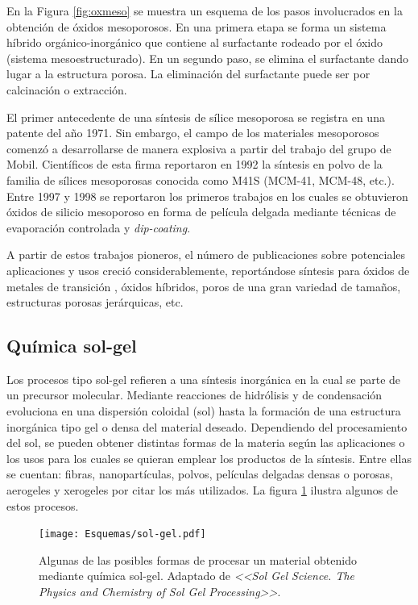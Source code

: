 	 En la Figura \ref{fig:oxmeso} se muestra un esquema de los pasos involucrados en la obtención de óxidos mesoporosos. En una primera etapa se forma un sistema híbrido orgánico-inorgánico que contiene al surfactante rodeado por el óxido (sistema mesoestructurado). En un segundo paso, se elimina el surfactante dando lugar a la estructura porosa. La eliminación del surfactante puede ser por calcinación o extracción.
 

     El primer antecedente de una síntesis de sílice mesoporosa se registra en una patente del año 1971. Sin embargo, el campo de los materiales mesoporosos comenzó a desarrollarse de manera explosiva a partir del trabajo del grupo de Mobil. Científicos de esta firma reportaron en 1992 la síntesis en polvo de la familia de sílices mesoporosas conocida como M41S (MCM-41, MCM-48, etc.).\cite{Kresge1992,Beck1992} Entre 1997 y 1998 se reportaron los primeros trabajos en los cuales se obtuvieron óxidos de silicio mesoporoso en forma de película delgada mediante técnicas de evaporación controlada y \textit{dip-coating}.\cite{Lu1997,Zhao1998a,Zhao1998,Brinker1999} 

     A partir de estos trabajos pioneros, el número de publicaciones sobre potenciales aplicaciones y usos creció considerablemente, reportándose síntesis para óxidos de metales de transición \cite{Ciesla1996,Ulagappan1996,Antonelli1995}, óxidos híbridos, poros de una gran variedad de tamaños, estructuras porosas jerárquicas, etc.\cite{Soler-Illia2006,Moller1998} %
   
	\subsection{Química sol-gel}

	 Los procesos tipo sol-gel refieren a una síntesis inorgánica en la cual se parte de un precursor molecular. Mediante reacciones de hidrólisis y de condensación evoluciona en una dispersión coloidal (sol) hasta la formación de una estructura inorgánica tipo gel o densa del material deseado. Dependiendo del procesamiento del sol, se pueden obtener distintas formas de la materia según las aplicaciones o los usos para los cuales se quieran emplear los productos de la síntesis. Entre ellas se cuentan: fibras, nanopartículas, polvos, películas delgadas densas o porosas, aerogeles y xerogeles por citar los más utilizados. La figura \ref{fig:sol-gel-process} ilustra algunos de estos procesos.

	 		\begin{figure}[ht!]
 				\begin{center}
 				\texttt{[image: Esquemas/sol-gel.pdf]}
 				\caption{Algunas de las posibles formas de procesar un material obtenido mediante química sol-gel. Adaptado de \textit{<<Sol Gel Science. The Physics and Chemistry of Sol Gel Processing>>}.\cite{Brinker1990}}
 				\label{fig:sol-gel-process}
 		   	    \end{center}
 		   	    \end{figure}

